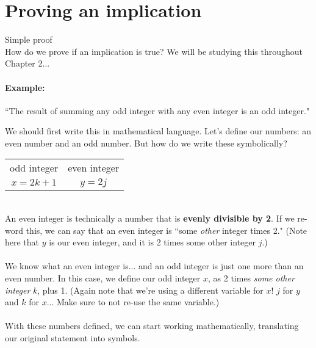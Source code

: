         
    \section*{Proving an implication}

        \begin{intro}{Simple proof} ~\\
            How do we prove if an implication is true? We will be studying
            this throughout Chapter 2...

            \paragraph{Example:}
            ``The result of summing any odd integer with any even integer is an odd integer."

            We should first write this in mathematical language. Let's define our numbers:
            an even number and an odd number. But how do we write these symbolically?

            \begin{center}
                \begin{tabular}{c c}
                    odd integer & even integer
                    \\
                    $x = 2k+1$ & $y = 2j$
                \end{tabular}
            \end{center}
            ~\\
            An even integer is technically a number that is \textbf{evenly divisible by 2}.
            If we re-word this, we can say that an even integer is ``some \textit{other} integer
            times 2." (Note here that $y$ is our even integer, and it is 2 times some other integer $j$.)
            ~\\~\\
            We know what an even integer is... and an odd integer is just one more than an even number.
            In this case, we define our odd integer $x$, as 2 times \textit{some other integer} $k$, plus 1.
            (Again note that we're using a different variable for $x$! $j$ for $y$ and $k$ for $x$...
            Make sure to not re-use the same variable.)
            ~\\~\\
            With these numbers defined, we can start working mathematically, translating our original
            statement into symbols.


\end{intro}

